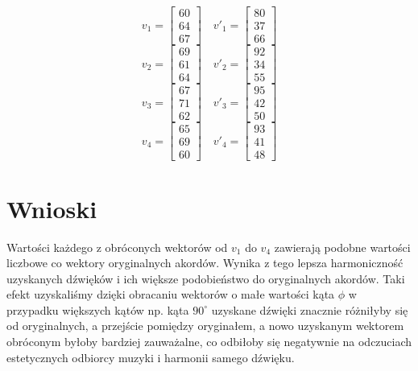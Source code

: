 \begin{equation*}
v_{1} =
    \begin{bmatrix}
     60 \\
     64 \\
     67
    \end{bmatrix}
    \quad
    v'_{1} =
    \begin{bmatrix}
     80 \\
     37 \\
     66
    \end{bmatrix}
\end{equation*}
\quad
\begin{equation*}
    v_{2} =
    \begin{bmatrix}
     69 \\
     61 \\
     64
    \end{bmatrix}
    \quad
    v'_{2} =
    \begin{bmatrix}
     92 \\
     34 \\
     55
    \end{bmatrix}
\end{equation*}
\quad
\begin{equation*}
    v_{3} =
    \begin{bmatrix}
     67 \\
     71 \\
     62
    \end{bmatrix}
    \quad
    v'_{3} =
    \begin{bmatrix}
     95 \\
     42 \\
     50
    \end{bmatrix}
\end{equation*}
\quad
\begin{equation*}
    v_{4} =
    \begin{bmatrix}
     65 \\
     69 \\
     60
    \end{bmatrix}
    \quad
    v'_{4} =
    \begin{bmatrix}
     93 \\
     41 \\
     48
    \end{bmatrix}
\end{equation*}

\section{Wnioski}
Wartości każdego z obróconych wektorów od $v_{1}$ do $v_{4}$ zawierają podobne wartości liczbowe co wektory oryginalnych akordów. Wynika z tego lepsza harmoniczność uzyskanych dźwięków  i ich większe podobieństwo do oryginalnych akordów. Taki efekt uzyskaliśmy dzięki obracaniu wektorów o małe wartości kąta $\phi$ w przypadku większych kątów np. kąta $90^{\circ}$ uzyskane dźwięki znacznie różniłyby się od oryginalnych, a przejście pomiędzy oryginałem, a nowo uzyskanym wektorem obróconym byłoby bardziej zauważalne, co odbiłoby się negatywnie na odczuciach estetycznych odbiorcy muzyki i harmonii samego dźwięku.

